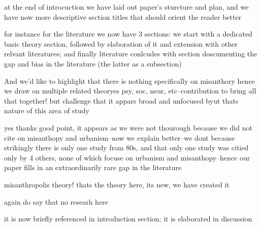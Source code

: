 

at the end of introcuction we have laid out paper's sturcture and plan, and 
we have now more descriptive section titles that should orient the reader better

for instance for the literature we now have 3 sections:  we start with a
dedicated basic theory section, followed by elaboration of
it and extension with other relvant literatures; and finally literature
conlcudes with section doscumenting the gap and bias in the literature (the
latter as a subsection)


And  we'd like to highlight that there is nothing specifically on misanthory hence we draw on
multiple related theoryes psy, soc, neur, etc--contribution to bring all
that together! but challenge that it appars broad and unfocused byut thats
nature of this area of study

yes thanks good point, it appears as we
were not thourough because we did not cite on misanthopy and urbanism--now we
explain better--we dont because strikingly there is only one study from 80s, and
that only one study was citied only by 4 others, none of which focuse on
urbanism and misanthopy--hence our paper fills in an extraordinarily rare gap in
the literature

 

misanthropolis theory! thats the theory here, its new, we have created it

again do say that no researh here


it is now briefly referenced in introduction section; it is elaborated in
discussion\\


